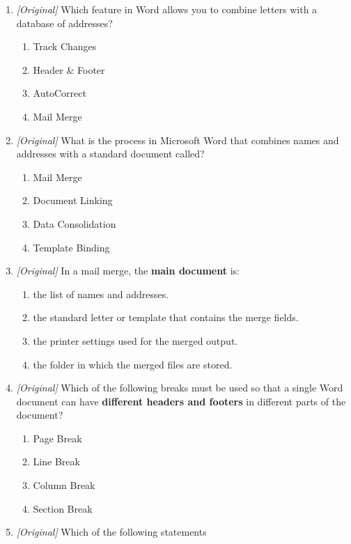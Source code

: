 \begin{enumerate}[label=\textbf{Q\arabic*.}, leftmargin=*]
\begin{enumerate}[label=\Alph*.]
    \item a recorded edit that stores the author's name.
  \end{enumerate}
\item \textit{[Original]} Which feature in Word allows
you to combine letters with a database of addresses?
  \begin{enumerate}[label=\Alph*.]
    \item Track Changes
    \item Header \& Footer
    \item AutoCorrect
    \item Mail Merge
  \end{enumerate}
\item \textit{[Original]} What is the process in Microsoft
Word that combines names and addresses with a standard document called?
  \begin{enumerate}[label=\Alph*.]
    \item Mail Merge
    \item Document Linking
    \item Data Consolidation
    \item Template Binding
  \end{enumerate}
\item \textit{[Original]} In a mail merge, the \textbf{main document} is:
  \begin{enumerate}[label=\Alph*.]
    \item the list of names and addresses.
    \item the standard letter or template that contains the merge fields.
    \item the printer settings used for the merged output.
    \item the folder in which the merged files are stored.
  \end{enumerate}
\item \textit{[Original]} Which of the following breaks must be used so that a
  single Word document can have \textbf{different headers and footers} in
  different parts of the document?
  \begin{enumerate}[label=\Alph*.]
    \item Page Break
    \item Line Break
    \item Column Break
    \item Section Break
  \end{enumerate}
\item \textit{[Original]} Which of the following statements

\end{enumerate}
